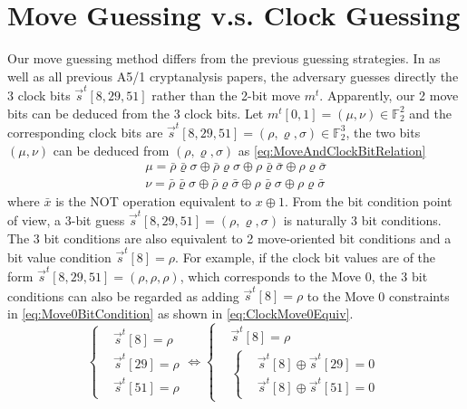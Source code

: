 \section{Move Guessing v.s. Clock Guessing}
Our move guessing method differs from the previous guessing strategies.
In \cite{AC:Zhang19} as well as all previous A5/1 cryptanalysis papers, the adversary guesses directly the 3 clock bits $\vec{s}^t[8,29,51]$ rather than the 2-bit move $m^t$.
Apparently, our 2 move bits can be deduced from the 3 clock bits.
Let $m^t[0,1]=(\mu, \nu)\in \mathbb{F}_2^2$ and the corresponding clock bits are $\vec{s}^t[8,29,51]=(\rho,\varrho, \sigma)\in \mathbb{F}_2^3$, the two bits $(\mu, \nu)$ can be deduced from $(\rho,\varrho, \sigma)$ as \eqref{eq:MoveAndClockBitRelation}
\begin{equation}\label{eq:MoveAndClockBitRelation}
\begin{aligned}
  \mu=\bar{\rho}\bar{\varrho}\sigma \oplus
  \bar{\rho}\varrho \sigma \oplus
  \rho \bar{\varrho} \bar{\sigma} \oplus
  \rho \varrho \bar{\sigma} \\
  \nu=\bar{\rho}\bar{\varrho}\sigma \oplus
  \bar{\rho}\varrho\bar{\sigma} \oplus
  \rho\bar{\varrho}\sigma \oplus
  \rho \varrho \bar{\sigma}
\end{aligned}
\end{equation}
where $\bar{x}$ is the NOT operation equivalent to $x\oplus 1$.
From the bit condition point of view, a 3-bit guess  $\vec{s}^t[8,29,51]=(\rho,\varrho, \sigma)$ is naturally 3 bit conditions.
The 3 bit conditions are also equivalent to 2 move-oriented  bit conditions and a bit value condition $\vec{s}^t[8]=\rho$.
For example, if the clock bit values are of the form $\vec{s}^t[8,29,51]=(\rho, \rho, \rho)$, which corresponds to the Move 0, the 3 bit conditions can also be regarded as adding $\vec{s}^t[8]=\rho$ to the Move 0 constraints in \eqref{eq:Move0BitCondition} as shown in \eqref{eq:ClockMove0Equiv}.
\begin{equation}\label{eq:ClockMove0Equiv}
  \left\{
  \begin{aligned}
    &\vec{s}^t[8]=\rho\\
    &\vec{s}^t[29]=\rho\\
    &\vec{s}^t[51]=\rho
  \end{aligned}
  \right.
  \Leftrightarrow
  \left\{
    \begin{aligned}
  &\vec{s}^t[8]=\rho\\
  &\left\{
  \begin{aligned}
    &\vec{s}^t[8]\oplus\vec{s}^t[29]=0\\
    &\vec{s}^t[8]\oplus\vec{s}^t[51]=0
  \end{aligned}
  \right.
    \end{aligned}
  \right.
\end{equation}
